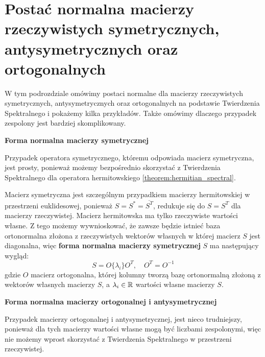 \newcommand{\cblock}[2]{
\left\|
\begin{matrix}
#1 & #2\\
-#2 & #1
\end{matrix}
\right\|
}

\section{Postać normalna macierzy rzeczywistych symetrycznych, antysymetrycznych oraz ortogonalnych}

W tym podrozdziale omówimy postaci normalne dla macierzy rzeczywistych symetrycznych, antysymetrycznych oraz ortogonalnych na podstawie Twierdzenia Spektralnego i pokażemy kilka przykładów. Także omówimy dlaczego przypadek zespolony jest bardziej skomplikowany.

\vspace{0.3em}
\medskip
\noindent\textbf{Forma normalna macierzy symetrycznej}
\vspace{0.3em}


Przypadek operatora symetrycznego, któremu odpowiada macierz symetryczna, jest prosty, ponieważ możemy bezpośrednio skorzystać z Twierdzenia Spektralnego dla operatora hermitowskiego \ref{theorem:hermitian_spectral}.  

Macierz symetryczna jest szczególnym przypadkiem macierzy hermitowskiej w przestrzeni euklidesowej, ponieważ $S = S^* = \overline{S^T}$, redukuje się do $S = S^T$ dla macierzy rzeczywistej. Macierz hermitowska ma tylko rzeczywiste wartości własne. Z tego możemy wywnioskować, że zawsze będzie istnieć baza ortonormalna złożona z rzeczywistych wektorów własnych w której macierz $S$ jest diagonalna, więc \textbf{forma normalna macierzy symetrycznej} $S$ ma następujący wygląd:
\begin{equation}
    S = O\{\lambda_i\}O^T, \quad O^T = O^{-1} 
\end{equation}
gdzie $O$ macierz ortogonalna, której kolumny tworzą bazę ortonormalną złożoną z wektorów własnych macierzy $S$, a $\lambda_i \in 
\mathbb{R}$ wartości własne macierzy $S$.

\vspace{0.3em}
\medskip
\noindent\textbf{Forma normalna macierzy ortogonalnej i antysymetrycznej}
\vspace{0.3em}

Przypadek macierzy ortogonalnej i antysymetrycznej, jest nieco trudniejszy, ponieważ dla tych macierzy wartości własne mogą być liczbami zespolonymi, więc nie możemy wprost skorzystać z Twierdzenia Spektralnego w przestrzeni rzeczywistej. 

